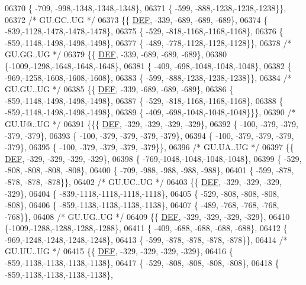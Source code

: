\begin{DoxyCode}
06370 \{ -709, -998,-1348,-1348,-1348\},
06371 \{ -599, -888,-1238,-1238,-1238\}\},
06372 \textcolor{comment}{/* GU.GC..UG */}
06373 \{\{  \mbox{\hyperlink{1_88_84__epars_8h_a397419fc12b37ed479c8abb9d444d843}{DEF}}, -339, -689, -689, -689\},
06374 \{ -839,-1128,-1478,-1478,-1478\},
06375 \{ -529, -818,-1168,-1168,-1168\},
06376 \{ -859,-1148,-1498,-1498,-1498\},
06377 \{ -489, -778,-1128,-1128,-1128\}\},
06378 \textcolor{comment}{/* GU.GG..UG */}
06379 \{\{  \mbox{\hyperlink{1_88_84__epars_8h_a397419fc12b37ed479c8abb9d444d843}{DEF}}, -339, -689, -689, -689\},
06380 \{-1009,-1298,-1648,-1648,-1648\},
06381 \{ -409, -698,-1048,-1048,-1048\},
06382 \{ -969,-1258,-1608,-1608,-1608\},
06383 \{ -599, -888,-1238,-1238,-1238\}\},
06384 \textcolor{comment}{/* GU.GU..UG */}
06385 \{\{  \mbox{\hyperlink{1_88_84__epars_8h_a397419fc12b37ed479c8abb9d444d843}{DEF}}, -339, -689, -689, -689\},
06386 \{ -859,-1148,-1498,-1498,-1498\},
06387 \{ -529, -818,-1168,-1168,-1168\},
06388 \{ -859,-1148,-1498,-1498,-1498\},
06389 \{ -409, -698,-1048,-1048,-1048\}\}\},
06390 \textcolor{comment}{/* GU.U@..UG */}
06391 \{\{\{  \mbox{\hyperlink{1_88_84__epars_8h_a397419fc12b37ed479c8abb9d444d843}{DEF}}, -329, -329, -329, -329\},
06392 \{ -100, -379, -379, -379, -379\},
06393 \{ -100, -379, -379, -379, -379\},
06394 \{ -100, -379, -379, -379, -379\},
06395 \{ -100, -379, -379, -379, -379\}\},
06396 \textcolor{comment}{/* GU.UA..UG */}
06397 \{\{  \mbox{\hyperlink{1_88_84__epars_8h_a397419fc12b37ed479c8abb9d444d843}{DEF}}, -329, -329, -329, -329\},
06398 \{ -769,-1048,-1048,-1048,-1048\},
06399 \{ -529, -808, -808, -808, -808\},
06400 \{ -709, -988, -988, -988, -988\},
06401 \{ -599, -878, -878, -878, -878\}\},
06402 \textcolor{comment}{/* GU.UC..UG */}
06403 \{\{  \mbox{\hyperlink{1_88_84__epars_8h_a397419fc12b37ed479c8abb9d444d843}{DEF}}, -329, -329, -329, -329\},
06404 \{ -839,-1118,-1118,-1118,-1118\},
06405 \{ -529, -808, -808, -808, -808\},
06406 \{ -859,-1138,-1138,-1138,-1138\},
06407 \{ -489, -768, -768, -768, -768\}\},
06408 \textcolor{comment}{/* GU.UG..UG */}
06409 \{\{  \mbox{\hyperlink{1_88_84__epars_8h_a397419fc12b37ed479c8abb9d444d843}{DEF}}, -329, -329, -329, -329\},
06410 \{-1009,-1288,-1288,-1288,-1288\},
06411 \{ -409, -688, -688, -688, -688\},
06412 \{ -969,-1248,-1248,-1248,-1248\},
06413 \{ -599, -878, -878, -878, -878\}\},
06414 \textcolor{comment}{/* GU.UU..UG */}
06415 \{\{  \mbox{\hyperlink{1_88_84__epars_8h_a397419fc12b37ed479c8abb9d444d843}{DEF}}, -329, -329, -329, -329\},
06416 \{ -859,-1138,-1138,-1138,-1138\},
06417 \{ -529, -808, -808, -808, -808\},
06418 \{ -859,-1138,-1138,-1138,-1138\},

\end{DoxyCode}
